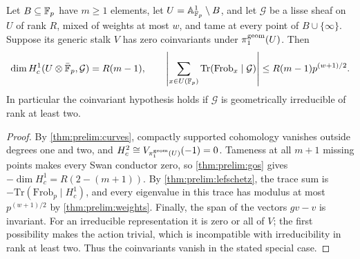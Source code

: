 \begin{lemma}\label{lem:tame-trace-bound}
Let $B\subseteq\mathbb F_p$ have $m\ge1$ elements, let
$U=\mathbb A^1_{\mathbb F_p}\setminus B$, and let $\mathcal G$ be a lisse sheaf on $U$
of rank $R$, mixed of weights at most $w$, and tame at every point of
$B\cup\{\infty\}$. Suppose its generic stalk $V$ has zero coinvariants under
$\pi_1^{\rm geom}(U)$. Then
\[
 \dim H^1_c(U\otimes\bar{\mathbb F}_p,\mathcal G)=R(m-1),\qquad
 \left|\sum_{x\in U(\mathbb F_p)}\mathrm{Tr}(\mathrm{Frob}_x\mid\mathcal G)\right|
 \le R(m-1)p^{(w+1)/2}.
\]
In particular the coinvariant hypothesis holds if $\mathcal G$ is
geometrically irreducible of rank at least two.
\end{lemma}

\begin{proof}
By \cref{thm:prelim:curves}, compactly supported cohomology vanishes outside
degrees one and two, and $H^2_c\cong V_{\pi_1^{\rm geom}(U)}(-1)=0$.
Tameness at all $m+1$ missing points makes every Swan conductor zero, so
\cref{thm:prelim:gos} gives
$-\dim H^1_c=R(2-(m+1))$. By \cref{thm:prelim:lefschetz}, the trace sum is
$-\mathrm{Tr}(\mathrm{Frob}_p\mid H^1_c)$, and every eigenvalue in this trace
has modulus at most $p^{(w+1)/2}$ by \cref{thm:prelim:weights}.
Finally, the span of the vectors $gv-v$ is invariant. For an irreducible
representation it is zero or all of $V$; the first possibility makes the
action trivial, which is incompatible with irreducibility in rank at least
two. Thus the coinvariants vanish in the stated special case.
\end{proof}

